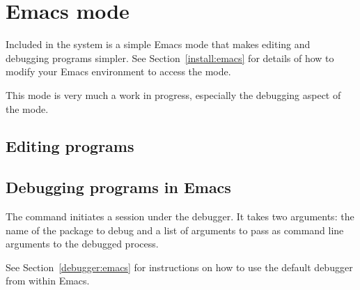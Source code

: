 \chapter{\go Emacs mode}
\label{emacs}

Included in the \go system is a simple Emacs mode that makes editing and debugging \go programs simpler. See Section~\vref{install:emacs} for details of how to modify your Emacs environment to access the \go mode.
\begin{aside}
This mode is very much a work in progress, especially the debugging aspect of the mode.
\end{aside}

\section{Editing \go programs}


\section{Debugging \go programs in Emacs}
The  command initiates a \go session under the debugger. It takes two arguments: the name of the package to debug and a list of arguments to pass as command line arguments to the debugged process.

See Section~\vref{debugger:emacs} for instructions on how to use the default debugger from within Emacs.

